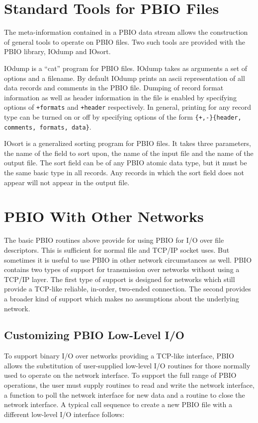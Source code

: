 \section{Standard Tools for PBIO Files}
The meta-information contained in a PBIO data stream allows the construction
of general tools to operate on PBIO files.  Two such tools are provided with
the PBIO library, IOdump and IOsort.

IOdump is a ``cat'' program for PBIO files.  IOdump takes as arguments a set
of options and a filename.  By default IOdump prints an ascii representation
of all data records and comments in the PBIO file.  Dumping of record format
information as well as header information in the file is enabled by specifying
options of {\tt +formats} and {\tt +header} respectively.  In general,
printing for any record type can be turned on or off by specifying options
of the form {\tt \{+,-\}\{header, comments, formats, data\}}.

IOsort is a generalized sorting program for PBIO files.  It takes three
parameters, the name of the field to sort upon, the name of the input file and
the name of the output file.  The sort field can be of any PBIO atomic data
type, but it must be the same basic type in all records.  Any records in which
the sort field does not appear will not appear in the output file.

\section{PBIO With Other Networks}

The basic PBIO routines above provide for using PBIO for I/O over file
descriptors.  This is sufficient for normal file and TCP/IP socket uses.  But
sometimes it is useful to use PBIO in other network circumstances as well.
PBIO contains two types of support for transmission over networks without
using a TCP/IP layer.  The first type of support is designed for networks
which still provide a TCP-like reliable, in-order, two-ended connection.  The
second provides a broader kind of support which makes no assumptions about the
underlying network.

\subsection{Customizing PBIO Low-Level I/O}

To support binary I/O over networks providing a TCP-like interface, PBIO
allows the substitution of user-supplied low-level I/O routines for those
normally used to operate on the network interface.  To support the full range
of PBIO operations, the user must supply routines to read and write the
network interface, a function to poll the network interface for new data and a
routine to close the network interface.  A typical call sequence to create a
new PBIO file with a different low-level I/O interface follows:

